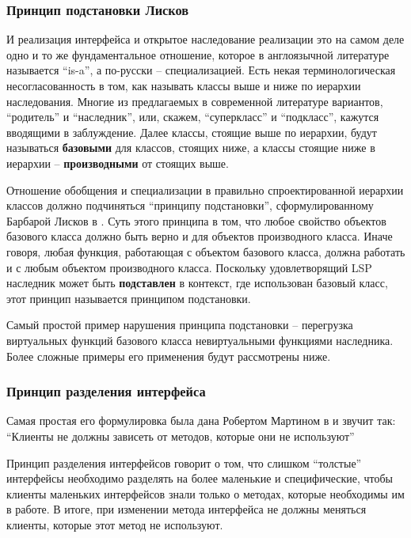 \documentclass[a4paper,12pt,oneside]{article}
\begin{document}
\subsubsection{Принцип подстановки Лисков}

И реализация интерфейса и открытое наследование реализации это на самом деле одно и то же фундаментальное отношение, которое в англоязычной литературе называется ``is-a'', а по-русски -- специализацией. Есть некая терминологическая несогласованность в том, как называть классы выше и ниже по иерархии наследования. Многие из предлагаемых в современной литературе вариантов, ``родитель'' и ``наследник'', или, скажем, ``суперкласс'' и ``подкласс'', кажутся вводящими в заблуждение. Далее классы, стоящие выше по иерархии, будут называться \textbf{базовыми} для классов, стоящих ниже, а классы стоящие ниже в иерархии -- \textbf{производными} от стоящих выше.

Отношение обобщения и специализации в правильно спроектированной иерархии классов должно подчиняться ``принципу подстановки'', сформулированному Барбарой Лисков в \cite{LSP}. Суть этого принципа в том, что любое свойство объектов базового класса должно быть верно и для объектов производного класса. Иначе говоря, любая функция, работающая с объектом базового класса, должна работать и с любым объектом производного класса. Поскольку удовлетворящий LSP наследник может быть \textbf{подставлен} в контекст, где использован базовый класс, этот принцип называется принципом подстановки.

Самый простой пример нарушения принципа подстановки -- перегрузка виртуальных функций базового класса невиртуальными функциями наследника. Более сложные примеры его применения будут рассмотрены ниже.

\subsubsection{Принцип разделения интерфейса}

Самая простая его формулировка была дана Робертом Мартином в \cite{ISP} и звучит так: ``Клиенты не должны зависеть от методов, которые они не используют''

Принцип разделения интерфейсов говорит о том, что слишком ``толстые'' интерфейсы необходимо разделять на более маленькие и специфические, чтобы клиенты маленьких интерфейсов знали только о методах, которые необходимы им в работе. В итоге, при изменении метода интерфейса не должны меняться клиенты, которые этот метод не используют.
\end{document}
